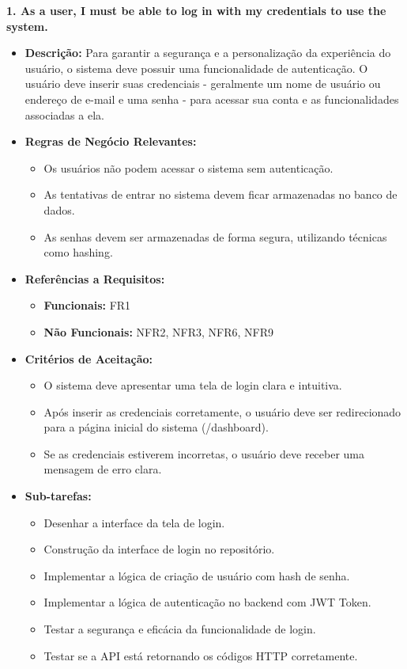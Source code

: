 \textbf{1. As a user, I must be able to log in with my credentials to use the system.}
\begin{itemize}
    \item \textbf{Descrição:} Para garantir a segurança e a personalização da experiência do usuário, o sistema deve possuir uma funcionalidade de autenticação. O usuário deve inserir suas credenciais - geralmente um nome de usuário ou endereço de e-mail e uma senha - para acessar sua conta e as funcionalidades associadas a ela.
    \item \textbf{Regras de Negócio Relevantes:} 
        \begin{itemize}
            \item Os usuários não podem acessar o sistema sem autenticação.
            \item As tentativas de entrar no sistema devem ficar armazenadas no banco de dados.
            \item As senhas devem ser armazenadas de forma segura, utilizando técnicas como hashing.
        \end{itemize}

    \item \textbf{Referências a Requisitos:}
        \begin{itemize}
            \item \textbf{Funcionais:} FR1
            \item \textbf{Não Funcionais:} NFR2, NFR3, NFR6, NFR9 
        \end{itemize}

    \item \textbf{Critérios de Aceitação:}
        \begin{itemize}
            \item O sistema deve apresentar uma tela de login clara e intuitiva.
            \item Após inserir as credenciais corretamente, o usuário deve ser redirecionado para a página inicial do sistema (/dashboard).
            \item Se as credenciais estiverem incorretas, o usuário deve receber uma mensagem de erro clara.
        \end{itemize}

        \item \textbf{Sub-tarefas:}
            \begin{itemize}
                \item Desenhar a interface da tela de login.
                \item Construção da interface de login no repositório.
                \item Implementar a lógica de criação de usuário com hash de senha.
                \item Implementar a lógica de autenticação no backend com JWT Token.
                \item Testar a segurança e eficácia da funcionalidade de login.
                \item Testar se a API está retornando os códigos HTTP corretamente.
            \end{itemize}

\end{itemize}



